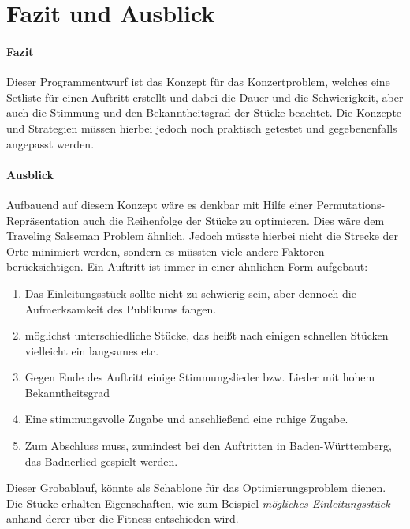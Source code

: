 \section{Fazit und Ausblick}\label{sec:fazit}
\paragraph{Fazit}
Dieser Programmentwurf ist das Konzept für das Konzertproblem, welches 
eine Setliste für einen Auftritt erstellt und dabei die Dauer und die Schwierigkeit, 
aber auch die Stimmung und den Bekanntheitsgrad der Stücke beachtet. 
Die Konzepte und Strategien müssen hierbei jedoch noch praktisch getestet und 
gegebenenfalls angepasst werden. \\
\paragraph{Ausblick}
Aufbauend auf diesem Konzept wäre es denkbar mit Hilfe einer Permutations-Repräsentation 
auch die Reihenfolge der Stücke zu optimieren. Dies wäre dem Traveling Salseman Problem
ähnlich. Jedoch müsste hierbei nicht die Strecke der Orte minimiert werden, sondern es müssten 
viele andere Faktoren berücksichtigen. Ein Auftritt ist immer in einer ähnlichen Form 
aufgebaut:
\begin{enumerate}
    \item Das Einleitungsstück sollte nicht zu schwierig sein, aber dennoch die Aufmerksamkeit 
        des Publikums fangen.
    \item möglichst unterschiedliche Stücke, das heißt nach einigen schnellen Stücken vielleicht ein 
        langsames etc. 
    \item Gegen Ende des Auftritt einige Stimmungslieder bzw. Lieder mit hohem Bekanntheitsgrad
    \item Eine stimmungsvolle Zugabe und anschließend eine ruhige Zugabe. 
    \item Zum Abschluss muss, zumindest bei den Auftritten in Baden-Württemberg, das Badnerlied gespielt werden. 
\end{enumerate}

Dieser Grobablauf, könnte als Schablone für das Optimierungsproblem dienen. Die Stücke erhalten Eigenschaften, 
wie zum Beispiel \textit{mögliches Einleitungsstück} anhand derer über die Fitness entschieden wird. 

